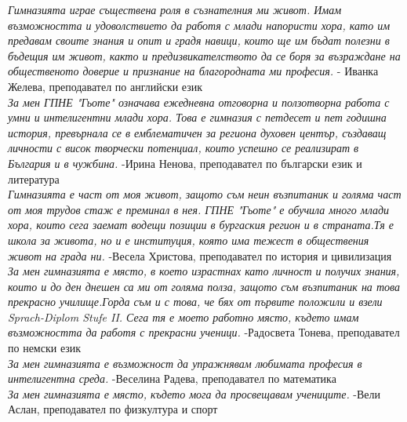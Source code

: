 \begin{multicols}{2}

\textit{Гимназията играе съществена роля в съзнателния ми живот. Имам възможността и удоволствието да работя с млади напористи хора, като им предавам своите знания и опит и градя навици, които ще им бъдат полезни в бъдещия им живот, както и предизвикателството  да се боря за възраждане на общественото доверие и признание на благородната ми професия.}
- Иванка Желева, преподавател по английски език \\

\textit{За мен ГПНЕ "Гьоте" означава ежедневна отговорна и ползотворна работа с умни и интелигентни млади хора. Това е гимназия с петдесет и пет годишна история, превърнала се в емблематичен за региона духовен център, създаващ личности с висок творчески потенциал, които успешно се реализират в България и в чужбина.}
-Ирина Ненова, преподавател по български език и литература \\

\textit{Гимназията е част от моя живот, защото съм неин възпитаник и голяма част от моя трудов стаж е преминал в нея. ГПНЕ "Гьоте" е обучила много млади хора, които сега заемат водещи позиции в бургаския регион и в страната.Тя е школа за живота, но и е институция, която има тежест  в обществения живот на града ни.}
-Весела  Христова, преподавател  по история и цивилизация \\

\textit{За мен гимназията е място, в което израстнах като личност и получих знания, които и до ден днешен са ми от голяма полза, защото съм възпитаник на това прекрасно училище.Горда съм и с това, че бях от първите положили и взели Sprach-Diplom Stufe II.
Сега тя е моето работно място, където имам възможността да работя с прекрасни ученици.}
-Радосвета Тонева, преподавател по немски език \\

\textit{За мен гимназията е възможност да упражнявам любимата професия в интелигентна среда.}
-Веселина Радева, преподавател по математика \\

\textit{За мен гимназията е място, където мога да просвещавам учениците.}
-Вели Аслан, преподавател по физкултура и спорт
\closearticle
\end{multicols}
